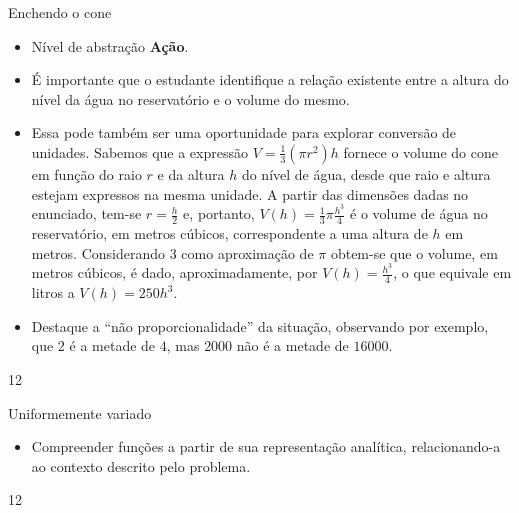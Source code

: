 \begin{sugestions}{Enchendo o cone}
{
\begin{itemize}
\item Nível de abstração \textbf{Ação}.

\item É importante que o estudante identifique a relação existente entre a altura do nível da água no reservatório e o volume do mesmo.

\item Essa pode também ser uma oportunidade para explorar conversão de unidades. Sabemos que a expressão $V=\frac{1}{3}(\pi r^2)h$ fornece o volume do cone em função do raio $r$ e da altura $h$ do nível de água, desde que raio e altura estejam expressos na mesma unidade. A partir das dimensões dadas no enunciado, tem-se $r=\frac{h}{2}$ e, portanto, $V(h)=\frac{1}{3}\pi\frac{h^3}{4}$ é o volume de água no reservatório, em metros cúbicos, correspondente a uma altura de $h$ em metros. Considerando $3$ como aproximação de $\pi$ obtem-se que o volume, em metros cúbicos, é dado, aproximadamente, por $V(h)=\frac{h^3}{4}$, o que equivale em litros a $V(h)=250h^3$.

\item Destaque a “não proporcionalidade” da situação, observando por exemplo, que $2$ é a metade de $4$, mas $2000$ não é a metade de $16000$.
\end{itemize}
}{1}{2}
\end{sugestions}

\begin{objectives}{Uniformemente variado}
{
\begin{itemize}

\item Compreender funções a partir de sua representação analítica, relacionando-a ao contexto descrito pelo problema.

\end{itemize}
}{1}{2}
\end{objectives}

